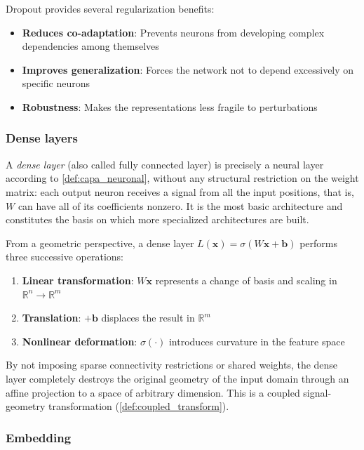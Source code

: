 Dropout provides several regularization benefits:
\begin{itemize}
	\item \textbf{Reduces co-adaptation}: Prevents neurons from developing complex dependencies among themselves
	\item \textbf{Improves generalization}: Forces the network not to depend excessively on specific neurons
	\item \textbf{Robustness}: Makes the representations less fragile to perturbations
\end{itemize}

\subsubsection{Dense layers}\label{def:capa_densa}

A \textit{dense layer} (also called fully connected layer) is precisely a neural layer according to \autoref{def:capa_neuronal}, without any structural restriction on the weight matrix: each output neuron receives a signal from all the input positions, that is, $W$ can have all of its coefficients nonzero. It is the most basic architecture and constitutes the basis on which more specialized architectures are built.

From a geometric perspective, a dense layer $L(\mathbf{x}) = \sigma(W\mathbf{x} + \mathbf{b})$ performs three successive operations:
\begin{enumerate}
	\item \textbf{Linear transformation}: $W\mathbf{x}$ represents a change of basis and scaling in $\mathbb{R}^n \to \mathbb{R}^m$
	\item \textbf{Translation}: $+ \mathbf{b}$ displaces the result in $\mathbb{R}^m$
	\item \textbf{Nonlinear deformation}: $\sigma(\cdot)$ introduces curvature in the feature space
\end{enumerate}

By not imposing sparse connectivity restrictions or shared weights, the dense layer completely destroys the original geometry of the input domain through an affine projection to a space of arbitrary dimension. This is a coupled signal-geometry transformation (\autoref{def:coupled_transform}).

\subsubsection{Embedding}


